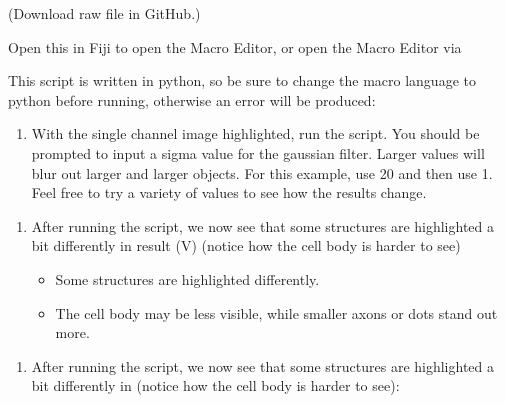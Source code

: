 \documentclass[letterpaper,10pt,english]{jupyterBook}
\begin{document}
\sphinxAtStartPar
(Download raw file in GitHub.)

\sphinxAtStartPar
Open this in Fiji to open the Macro Editor, or open the Macro Editor via 

\sphinxAtStartPar
This script is written in python, so be sure to change the macro language to
python before running, otherwise an error will be produced:

\sphinxAtStartPar
{}
\begin{enumerate}
%
\setcounter{enumi}{2}
\item {} 
\sphinxAtStartPar
With the single channel image highlighted, run the script. You should be prompted to
input a sigma value for the gaussian filter. Larger values will blur out larger and larger
objects. For this example, use 20 and then use 1. Feel free to try a variety of values to
see how the results change.

\end{enumerate}

\sphinxAtStartPar
{}
\begin{enumerate}
%
\setcounter{enumi}{3}
\item {} 
\sphinxAtStartPar
After running the script, we now see that some structures are highlighted a bit differently
in result (V) (notice how the cell body is harder to see)
\begin{itemize}
\item {} 
\sphinxAtStartPar
Some structures are highlighted differently.

\item {} 
\sphinxAtStartPar
The cell body may be less visible, while smaller axons or dots stand out more.

\end{itemize}

\end{enumerate}

\sphinxAtStartPar
{}
\begin{enumerate}
%
\setcounter{enumi}{4}
\item {} 
\sphinxAtStartPar
After running the script, we now see that some structures are highlighted a bit differently
in  (notice how the cell body is harder to see):

\end{enumerate}
\end{document}

